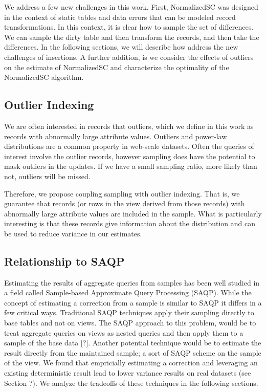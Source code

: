 We address a few new challenges in this work. First, NormalizedSC
was designed in the context of static tables and data errors that
can be modeled record transformations. In this context, it is clear
how to sample the set of differences. We can sample the dirty table
and then transform the records, and then take the differences. In
the following sections, we will describe how address the new challenges
of insertions. A further addition, is we consider the effects of outliers
on the estimate of NormalizedSC and characterize the optimality of
the NormalizedSC algorithm.

\subsection{Outlier Indexing}
We are often interested in records that outliers, 
which we define in this work as records with abnormally large attribute values.
Outliers and power-law distributions are a common property in web-scale datasets.
Often the queries of interest involve the outlier records, however sampling does 
have the potential to mask outliers in the updates.
If we have a small sampling ratio, more likely than not, outliers will be missed.

Therefore, we propose coupling sampling with outlier indexing. 
That is, we guarantee that records (or rows in the view derived from those records) 
with abnormally large attribute values are included in the sample.
What is particularly interesting is that these records give information about the distribution 
and can be used to reduce variance in our estimates.

\subsection{Relationship to SAQP}

Estimating the results of aggregate queries from samples has been
well studied in a field called Sample-based Approximate Query Processing
(SAQP). While the concept of estimating a correction from a sample
is similar to SAQP it differs in a few critical ways. Traditional
SAQP techniques apply their sampling directly to base tables and not
on views. The SAQP approach to this problem, would be to treat aggregate
queries on views as nested queries and then apply them to a sample
of the base data {[}?{]}. Another potential technique would be to
estimate the result directly from the maintained sample; a sort of
SAQP scheme on the sample of the view. We found that empricially estimating
a correction and leveraging an existing deterministic result lead
to lower variance results on real datasets (see Section ?). We analyze
the tradeoffs of these techniques in the following sections.